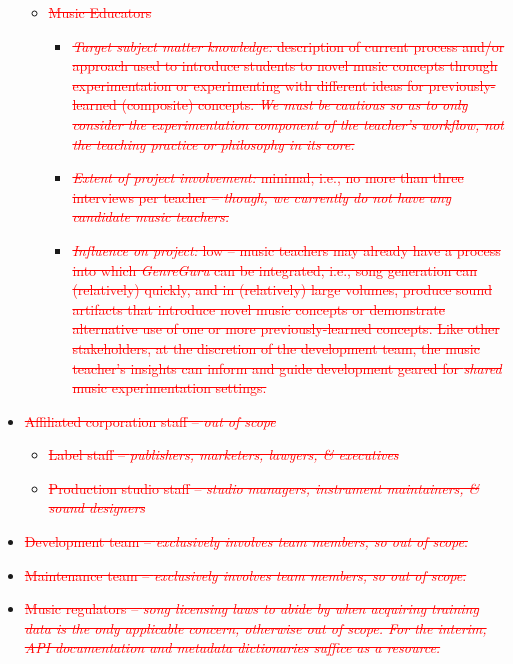 \documentclass[12pt]{article}
\begin{document}
\begin{itemize}
\begin{itemize}
    \item \textcolor{red}{\sout{Music Educators}}
    \begin{itemize}
      \item \textcolor{red}{\sout{\emph{Target subject matter knowledge:} description of current process and/or approach used to introduce students to novel music concepts through experimentation or experimenting with different ideas for previously-learned (composite) concepts. \emph{We must be cautious so as to only consider the experimentation component of the teacher's workflow, not the teaching practice or philosophy in its core.}}}
      \item \textcolor{red}{\sout{\emph{Extent of project involvement:} minimal, i.e., no more than three interviews per teacher -- \emph{though, we currently do not have any candidate music teachers.}}}
      \item \textcolor{red}{\sout{\emph{Influence on project:} low -- music teachers may already have a process into which \emph{GenreGuru} can be integrated, i.e., song generation can (relatively) quickly, and in (relatively) large volumes, produce sound artifacts that introduce novel music concepts or demonstrate alternative use of one or more previously-learned concepts. Like other stakeholders, at the discretion of the development team, the music teacher's insights can inform and guide development geared for \emph{shared} music experimentation settings.}}
    \end{itemize}
    
  \end{itemize}
  
  \item \textcolor{red}{\sout{Affiliated corporation staff -- \emph{out of scope}}}
  \begin{itemize}
    \item \textcolor{red}{\sout{Label staff -- \emph{publishers, marketers, lawyers, \& executives}}}
    \item \textcolor{red}{\sout{Production studio staff -- \emph{studio managers, instrument maintainers, \& sound designers}}}
  \end{itemize}
  
  \item \textcolor{red}{\sout{Development team -- \emph{exclusively involves team members, so out of scope}.}}
  \item \textcolor{red}{\sout{Maintenance team -- \emph{exclusively involves team members, so out of scope}.}}
  \item \textcolor{red}{\sout{Music regulators -- \emph{song licensing laws to abide by when acquiring training data is the only applicable concern, otherwise out of scope. For the interim, API documentation and metadata dictionaries suffice as a resource.}}}
\end{itemize}
\end{document}
